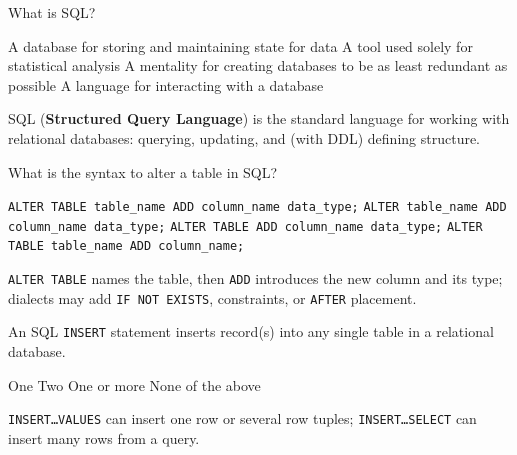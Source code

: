 



\question[4]
What is SQL?
\begin{choices}
  \choice A database for storing and maintaining state for data
  \choice A tool used solely for statistical analysis
  \choice A mentality for creating databases to be as least redundant as possible
  \CorrectChoice A language for interacting with a database
\end{choices}
\begin{solution}
  SQL (\textbf{Structured Query Language}) is the standard language for working with relational databases: querying, updating, and (with DDL) defining structure.
\end{solution}

\question[4]
What is the syntax to alter a table in SQL?
\begin{choices}
  \CorrectChoice \lstinline[style=sqlinline]!ALTER TABLE table_name ADD column_name data_type;!
  \choice \lstinline[style=sqlinline]!ALTER table_name ADD column_name data_type;!
  \choice \lstinline[style=sqlinline]!ALTER TABLE ADD column_name data_type;!
  \choice \lstinline[style=sqlinline]!ALTER TABLE table_name ADD column_name;!
\end{choices}
\begin{solution}
  \texttt{ALTER TABLE} names the table, then \texttt{ADD} introduces the new column and its type; dialects may add \texttt{IF NOT EXISTS}, constraints, or \texttt{AFTER} placement.
\end{solution}

\question[4]
An SQL \lstinline[style=sqlinline]!INSERT! statement inserts \blank[5em] record(s) into any single table in a relational database.
\begin{choices}
  \choice One
  \choice Two
  \CorrectChoice One or more
  \choice None of the above
\end{choices}
\begin{solution}
  \texttt{INSERT\ldots VALUES} can insert one row or several row tuples; \texttt{INSERT\ldots SELECT} can insert many rows from a query.
\end{solution}

